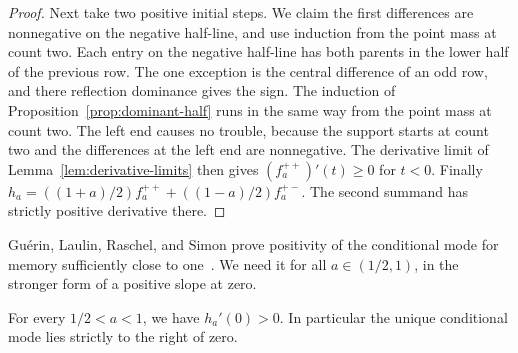 \begin{proof}
Next take two positive initial steps. We claim the first differences
are nonnegative on the negative half-line, and use induction from the
point mass at count two. Each entry on the negative half-line has
both parents in the lower half of the previous row. The one exception is the central
difference of an odd row, and there reflection dominance gives the
sign. The induction of Proposition~\ref{prop:dominant-half} runs in
the same way from the point mass at count two. The left end causes no
trouble, because the support starts at count two and the differences
at the left end are nonnegative. The derivative limit of Lemma~\ref{lem:derivative-limits} then
gives $(f_a^{++})'(t)\ge0$ for $t<0$.
Finally
$h_a=((1+a)/2)f_a^{++}+((1-a)/2)f_a^{+-}$.
The second summand has strictly positive derivative there.
\end{proof}

Gu\'erin, Laulin, Raschel, and Simon prove positivity of the conditional
mode for memory sufficiently close to one~\cite[Remark~2.1(a)]{glrs2025}.
We need it for all $a\in(1/2,1)$, in the stronger form of a positive
slope at zero.

\begin{lemma}\label{lem:positive-conditional-mode}
For every $1/2<a<1$, we have $h_a'(0)>0$. In particular the unique
conditional mode lies strictly to the right of zero.
\end{lemma}

